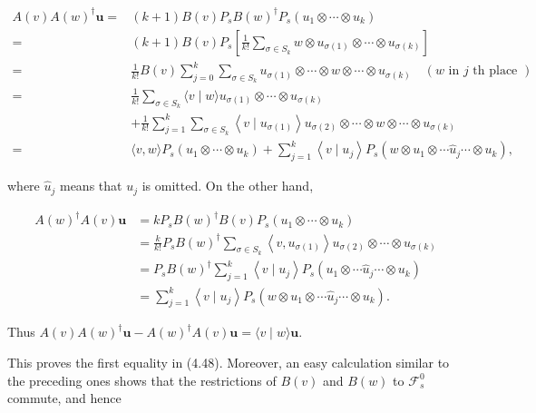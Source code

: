 \documentclass[10pt, letterpaper]{article}
\begin{document}
$$
\begin{aligned}
A(v) A(w)^{\dagger} \mathbf{u}= & (k+1) B(v) P_{s} B(w)^{\dagger} P_{s}\left(u_{1} \otimes \cdots \otimes u_{k}\right) \\
= & (k+1) B(v) P_{s}\left[\frac{1}{k!} \sum_{\sigma \in S_{k}} w \otimes u_{\sigma(1)} \otimes \cdots \otimes u_{\sigma(k)}\right] \\
= & \frac{1}{k!} B(v) \sum_{j=0}^{k} \sum_{\sigma \in S_{k}} u_{\sigma(1)} \otimes \cdots \otimes w \otimes \cdots \otimes u_{\sigma(k)} \quad(w \text { in } j \text { th place }) \\
= & \frac{1}{k!} \sum_{\sigma \in S_{k}}\langle v \mid w\rangle u_{\sigma(1)} \otimes \cdots \otimes u_{\sigma(k)} \\
& +\frac{1}{k!} \sum_{j=1}^{k} \sum_{\sigma \in S_{k}}\left\langle v \mid u_{\sigma(1)}\right\rangle u_{\sigma(2)} \otimes \cdots \otimes w \otimes \cdots \otimes u_{\sigma(k)} \\
= & \langle v, w\rangle P_{s}\left(u_{1} \otimes \cdots \otimes u_{k}\right)+\sum_{j=1}^{k}\left\langle v \mid u_{j}\right\rangle P_{s}\left(w \otimes u_{1} \otimes \cdots \widehat{u}_{j} \cdots \otimes u_{k}\right),
\end{aligned}
$$

where $\widehat{u}_{j}$ means that $u_{j}$ is omitted. On the other hand,

$$
\begin{aligned}
A(w)^{\dagger} A(v) \mathbf{u} & =k P_{s} B(w)^{\dagger} B(v) P_{s}\left(u_{1} \otimes \cdots \otimes u_{k}\right) \\
& =\frac{k}{k!} P_{s} B(w)^{\dagger} \sum_{\sigma \in S_{k}}\left\langle v, u_{\sigma(1)}\right\rangle u_{\sigma(2)} \otimes \cdots \otimes u_{\sigma(k)} \\
& =P_{s} B(w)^{\dagger} \sum_{j=1}^{k}\left\langle v \mid u_{j}\right\rangle P_{s}\left(u_{1} \otimes \cdots \widehat{u}_{j} \cdots \otimes u_{k}\right) \\
& =\sum_{j=1}^{k}\left\langle v \mid u_{j}\right\rangle P_{s}\left(w \otimes u_{1} \otimes \cdots \widehat{u}_{j} \cdots \otimes u_{k}\right) .
\end{aligned}
$$

Thus $A(v) A(w)^{\dagger} \mathbf{u}-A(w)^{\dagger} A(v) \mathbf{u}=\langle v \mid w\rangle \mathbf{u}$.

This proves the first equality in (4.48). Moreover, an easy calculation similar to the preceding ones shows that the restrictions of $B(v)$ and $B(w)$ to $\mathcal{F}_{s}^{0}$ commute, and hence
\end{document}
